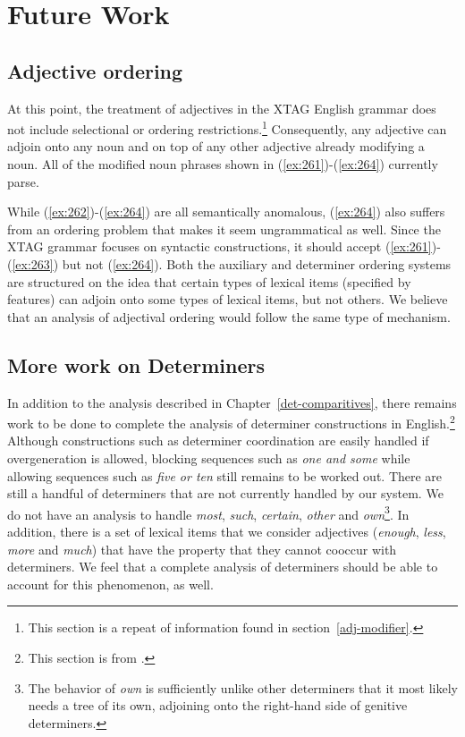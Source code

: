 \appendix 
\chapter{Future Work} 
\label{future-work} 
 
\section{Adjective ordering} 
 
At this point, the treatment of adjectives in the XTAG English grammar does not 
include selectional or ordering restrictions.\footnote{This section is a repeat of information found in section~\ref{adj-modifier}.} Consequently, any 
adjective can adjoin onto any noun and on top of any other adjective already 
modifying a noun. All of the modified noun phrases shown in (\ref{ex:261})-(\ref{ex:264}) 
currently parse. 
 
\beginsentences
{}\label{ex:261} 
\label{ex:262} 
\label{ex:263} 
\label{ex:264} 
\endsentences

 
While (\ref{ex:262})-(\ref{ex:264}) are all semantically anomalous, (\ref{ex:264}) also suffers 
from an ordering problem that makes it seem ungrammatical as well.  Since the 
XTAG grammar focuses on syntactic constructions, it should accept 
(\ref{ex:261})-(\ref{ex:263}) but not (\ref{ex:264}).  Both the auxiliary and determiner 
ordering systems are structured on the idea that certain types of lexical items 
(specified by features) can adjoin onto some types of lexical items, but not 
others.  We believe that an analysis of adjectival ordering would follow the 
same type of mechanism. 
 
\section{More work on Determiners} 
 
In addition to the analysis described in Chapter~\ref{det-comparitives}, there 
remains work to be done to complete the analysis of determiner constructions in 
English.\footnote{This section is from \cite{ircs:det98}.}  Although 
constructions such as determiner coordination are easily handled if 
overgeneration is allowed, blocking sequences such as {\it one and some} while 
allowing sequences such as {\it five or ten} still remains to be worked out. 
There are still a handful of determiners that are not currently handled by our 
system.  We do not have an analysis to handle {\it most}, {\it such}, {\it certain}, {\it other} and {\it own}\footnote{The behavior of {\it own} is sufficiently unlike other determiners that it most likely needs a tree of its own, adjoining onto the right-hand side of genitive determiners.}.  In 
addition, there is a set of lexical items that we consider adjectives ({\it enough}, {\it less}, {\it more} and {\it much}) that have the property that 
they cannot cooccur with determiners.  We feel that a complete analysis of 
determiners should be able to account for this phenomenon, as well. 
 
